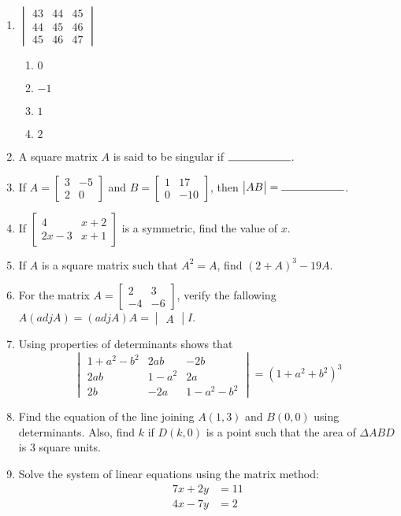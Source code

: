 \documentclass{article}
\providecommand{\mydet}[1]{\ensuremath{\begin{vmatrix}#1\end{vmatrix}}}
\providecommand{\myvec}[1]{\ensuremath{\begin{bmatrix}#1\end{bmatrix}}}
\begin{document}
\begin{enumerate}
    \item $\mydet{43 & 44 & 45 \\ 44 & 45 & 46 \\ 45 & 46 & 47}$
    \begin{enumerate}
        \item $0$
        \item $-1$
        \item $1$
        \item $2$
    \end{enumerate}

    \item A square matrix $A$ is said to be singular if $\rule{2cm}{0.15mm}$.
    
    \item If $A =\myvec{3 & -5 \\ 2 & 0}$ and $B = \myvec{1 & 17 \\ 0 & -10}$, then $\mydet{AB} = \rule{2cm}{0.15mm}$.
    
    \item If $\myvec{4 & x+2 \\ 2x-3 & x+1}$ is a symmetric, find the value of $x$.
    
    \item If $A$ is a square matrix such that $A^2 = A$, find $(2+A)^3 - 19A$.

    \item For the matrix $A = \myvec{2 & 3 \\ -4 & -6}$, verify the fallowing $A(adj A) = (adj A)A = \mydet{A}I$.

    \item Using properties of determinants shows that
	    \[
    		\begin{vmatrix}
        		1 + a^2 - b^2 & 2ab & -2b \\
        		2ab & 1 - a^2 & 2a \\
        		2b & -2a & 1 - a^2 - b^2
    		\end{vmatrix} = (1 + a^2 + b^2)^3
	    \]

    \item Find the equation of the line joining $A(1, 3)$ and $B(0, 0)$ using determinants. Also, find $k$ if $D(k, 0)$ is a point such that the area of $\Delta{ABD}$ is $3$ square units.
    
    \item Solve the system of linear equations using the matrix method:
    \begin{align*}
        7x + 2y &= 11 \\
        4x - 7y &= 2
    \end{align*}
    

\end{enumerate}
\end{document}
